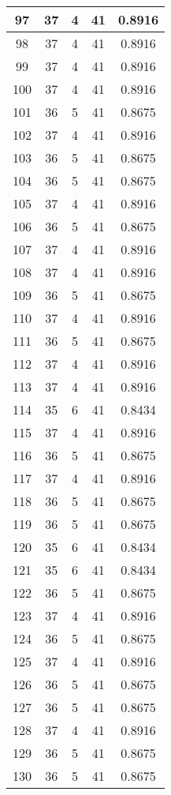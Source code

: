 \documentclass[letterpaper, 12pt]{article}
\begin{document}
\begin{longtable}{|c|c|c|c|c|}
\hline
97 & 37 & 4 & 41 & 0.8916 \\
\hline
98 & 37 & 4 & 41 & 0.8916 \\
\hline
99 & 37 & 4 & 41 & 0.8916 \\
\hline
100 & 37 & 4 & 41 & 0.8916 \\
\hline
101 & 36 & 5 & 41 & 0.8675 \\
\hline
102 & 37 & 4 & 41 & 0.8916 \\
\hline
103 & 36 & 5 & 41 & 0.8675 \\
\hline
104 & 36 & 5 & 41 & 0.8675 \\
\hline
105 & 37 & 4 & 41 & 0.8916 \\
\hline
106 & 36 & 5 & 41 & 0.8675 \\
\hline
107 & 37 & 4 & 41 & 0.8916 \\
\hline
108 & 37 & 4 & 41 & 0.8916 \\
\hline
109 & 36 & 5 & 41 & 0.8675 \\
\hline
110 & 37 & 4 & 41 & 0.8916 \\
\hline
111 & 36 & 5 & 41 & 0.8675 \\
\hline
112 & 37 & 4 & 41 & 0.8916 \\
\hline
113 & 37 & 4 & 41 & 0.8916 \\
\hline
114 & 35 & 6 & 41 & 0.8434 \\
\hline
115 & 37 & 4 & 41 & 0.8916 \\
\hline
116 & 36 & 5 & 41 & 0.8675 \\
\hline
117 & 37 & 4 & 41 & 0.8916 \\
\hline
118 & 36 & 5 & 41 & 0.8675 \\
\hline
119 & 36 & 5 & 41 & 0.8675 \\
\hline
120 & 35 & 6 & 41 & 0.8434 \\
\hline
121 & 35 & 6 & 41 & 0.8434 \\
\hline
122 & 36 & 5 & 41 & 0.8675 \\
\hline
123 & 37 & 4 & 41 & 0.8916 \\
\hline
124 & 36 & 5 & 41 & 0.8675 \\
\hline
125 & 37 & 4 & 41 & 0.8916 \\
\hline
126 & 36 & 5 & 41 & 0.8675 \\
\hline
127 & 36 & 5 & 41 & 0.8675 \\
\hline
128 & 37 & 4 & 41 & 0.8916 \\
\hline
129 & 36 & 5 & 41 & 0.8675 \\
\hline
130 & 36 & 5 & 41 & 0.8675 \\

\end{longtable}
\end{document}

